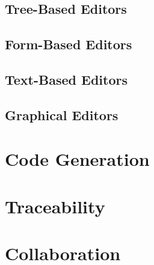 \documentclass{template/openetcs_article}
\begin{document}
\subsection{Tree-Based Editors}
\label{sec:language}

\subsection{Form-Based Editors}
\label{sec:formeditors}

\subsection{Text-Based Editors}
\label{sec:texteditors}

\subsection{Graphical Editors}
\label{sec:graphicaleditors}

\section{Code Generation}
\label{sec:editors}

\section{Traceability}
\label{sec:editors}

\section{Collaboration}
\label{sec:collaboration}
\end{document}

